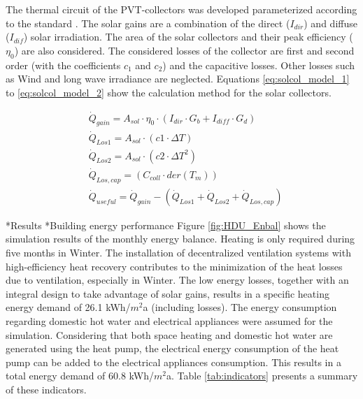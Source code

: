 \documentclass[twocolumn, a4paper,10pt]{article}
\makeatletter
\renewcommand\section{\@startsection{section}{1}{\z@}{3pt}{3pt}{\normalfont\large\bfseries}}
\renewcommand\subsection{\@startsection{subsection}{1}{\z@}{\z@}{\z@}{\normalfont\normalsize\bfseries}}
\renewcommand\subsection{\@startsection{subsection}{1}{\z@}{\z@}{0.1pt}{\normalfont\normalsize\bfseries}}
\makeatother
\begin{document}
The thermal circuit of the PVT-collectors was developed parameterized according to the standard \citet{ISO9806}. The solar gains are a combination of the direct ($I_{dir}$) and diffuse ($I_{dif}$) solar irradiation. The area of the solar collectors and their peak efficiency ($\eta_0$) are also considered. The considered losses of the collector are first and second order (with the coefficients $c_1$ and $c_2$) and the capacitive losses. Other losses such as Wind and long wave irradiance are neglected. Equations \ref{eq:solcol_model_1} to \ref{eq:solcol_model_2} show the calculation method for the solar collectors. 

\begingroup
\allowdisplaybreaks
\begin{align}
&\dot{Q}_{gain} = A_{sol} \cdot \eta_0 \cdot (I_{dir} \cdot G_b + I_{diff} \cdot G_d)\\
\label{eq:solcol_model_1}
&\dot{Q}_{Los1}=A_{sol} \cdot (c1 \cdot \Delta T)\\
&\dot{Q}_{Los2}=A_{sol} \cdot (c2 \cdot \Delta T^2)\\
&\dot{Q}_{Los,cap}=(C_{coll} \cdot der(T_m))\\
&\dot{Q}_{useful} = \dot{Q}_{gain}-(\dot{Q}_{Los1} + \dot{Q}_{Los2} + \dot{Q}_{Los,cap})
\label{eq:solcol_model_2}
\end{align} 
\endgroup

\section*{Results}
\subsection*{Building energy performance}
Figure \ref{fig:HDU_Enbal} shows the simulation results of the monthly energy balance. Heating is only required during five months in Winter. The installation of decentralized ventilation systems with high-efficiency heat recovery contributes to the minimization of the heat losses due to ventilation, especially in Winter. The low energy losses, together with an integral design to take advantage of solar gains, results in a specific heating energy demand of 26.1 kWh/$m^2$a (including losses). The energy consumption regarding domestic hot water and electrical appliances were assumed for the simulation. Considering that both space heating and domestic hot water are generated using the heat pump, the electrical energy consumption of the heat pump can be added to the electrical appliances consumption. This results in a total energy demand of 60.8 kWh/$m^2$a. Table \ref{tab:indicators} presents a summary of these indicators. 
\end{document}
